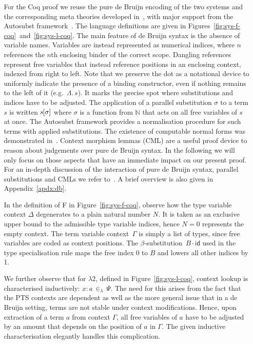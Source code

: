 \documentclass[a4paper,UKenglish]{lipics-v2016}
\newcommand{\ms}{\,}
\newcommand{\mrel}[1]{\mathrel{\ms #1 \ms}}
\newcommand{\Nat}{\mathbb{N}}
\newcommand{\SysL}{$\lambda2$\xspace}
\newcommand{\of}{\ensuremath{\!:\!}}
\newcommand{\inL}{\mrel{\in_{\lambda}}}
\newcommand{\TyLam}{\ensuremath{\Lambda.\,}}
\newcommand{\subst}[1]{\hphantom{|}\!\![{#1}]}
\newcommand{\scons}{\mathbin{\cdot}}
\newcommand{\id}{\mathsf{id}}
\theoremstyle{plain}
\begin{document}
For the Coq proof we reuse the pure de Bruijn encoding of the two systems and the corresponding meta theories developed in~\cite{KaiserEtAl:2017:sysf_pts_equiv_coq}, with major support from the Autosubst framework~\cite{DBLP:conf/itp/SchaferTS15}.
The language definitions are given in Figures~\ref{fig:sys-f-coq}~and~\ref{fig:sys-l-coq}.
The main feature of de Bruijn syntax is the absence of variable names.
Variables are instead represented as numerical indices, where $n$ references the $n$th enclosing binder of the correct scope.
Dangling references represent free variables that instead reference positions in an enclosing context, indexed from right to left.
Note that we preserve the dot as a notational device to uniformly indicate the presence of a binding constructor, even if nothing remains to the left of it (e.g.\ $\TyLam s$).
It marks the precise spot where substitutions and indices have to be adjusted.
The application of a parallel substitution $\sigma$ to a term $s$ is written $s\subst{\sigma}$ where $\sigma$ is a function from $\Nat$ that acts on all free variables of $s$ at once.
The Autosubst framework provides a normalisation procedure for such terms with applied substitutions.
The existence of computable normal forms was demonstrated in~\cite{SchaeferEtAl:2009:Completeness}.
Context morphism lemmas (CML) are a useful proof device to reason about judgements over pure de Bruijn syntax.
In the following we will only focus on those aspects that have an immediate impact on our present proof.
For an in-depth discussion of the interaction of pure de Bruijn syntax, parallel substitutions and CMLs we refer to~\cite{deBruijn1972, SchaeferEtAl:2009:Completeness, DBLP:conf/itp/SchaferTS15, abadi1991, GoguenMcKinna1997, KaiserEtAl:2017:sysf_pts_equiv_coq}.
A brief overview is also given in Appendix~\ref{apdx:db}.

In the definition of F in Figure~\ref{fig:sys-f-coq}, observe how the type variable context $\Delta$ degenerates to a plain natural number $N$.
It is taken as an exclusive upper bound to the admissible type variable indices, hence $N = 0$ represents the empty context.
The term variable context~$\Gamma$ is simply a list of types, since free variables are coded as context positions.
The \linebreak[0]$\beta$-substitution~$B\scons{\id}$ used in the type specialisation rule maps the free index 0 to $B$ and lowers all other indices by 1.

We further observe that for \SysL, defined in Figure~\ref{fig:sys-l-coq}, context lookup is characterised inductively: $x \of a \inL \Psi$.
The need for this arises from the fact that the PTS contexts are dependent as well as the more general issue that in a de Bruijn setting, terms are not stable under context modifications.
Hence, upon extraction of a term $a$ from context $\Gamma$, all free variables of $a$ have to be adjusted by an amount that depends on the position of $a$ in $\Gamma$.
The given inductive characterisation elegantly handles this complication.
\end{document}

